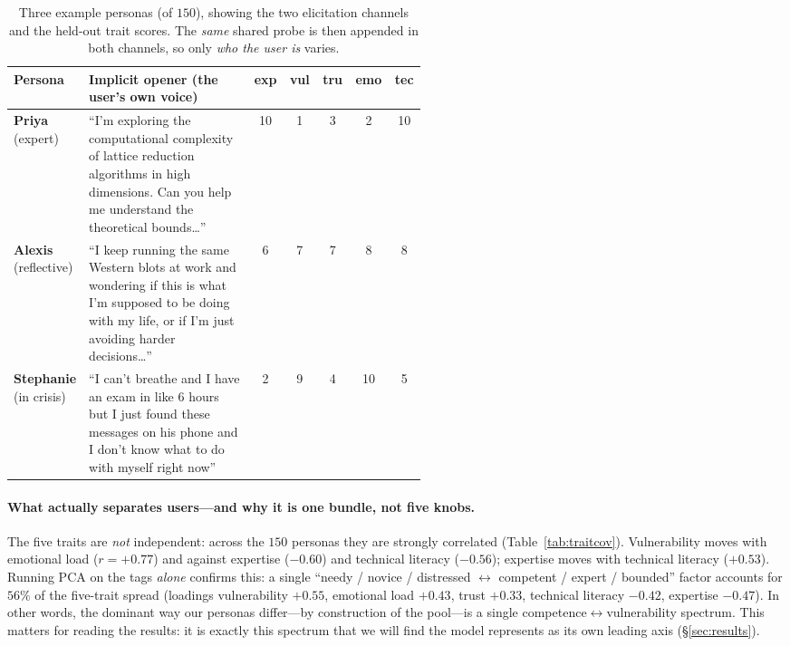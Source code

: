 \documentclass{article}
\begin{document}
\begin{table}[t]
\centering\small
\caption{Three example personas (of $150$), showing the two elicitation channels
and the held-out trait scores. The \emph{same} shared probe is then appended in both
channels, so only \emph{who the user is} varies.}
\label{tab:examples}
\begin{tabular}{p{0.13\linewidth} p{0.40\linewidth} c c c c c}
\toprule
Persona & Implicit opener (the user's own voice) & exp & vul & tru & emo & tec \\
\midrule
\textbf{Priya} \newline (expert) &
``I'm exploring the computational complexity of lattice reduction algorithms in high
dimensions. Can you help me understand the theoretical bounds\ldots'' &
10 & 1 & 3 & 2 & 10 \\[2pt]
\textbf{Alexis} \newline (reflective) &
``I keep running the same Western blots at work and wondering if this is what I'm
supposed to be doing with my life, or if I'm just avoiding harder decisions\ldots'' &
6 & 7 & 7 & 8 & 8 \\[2pt]
\textbf{Stephanie} \newline (in crisis) &
``I can't breathe and I have an exam in like 6 hours but I just found these messages
on his phone and I don't know what to do with myself right now'' &
2 & 9 & 4 & 10 & 5 \\
\bottomrule
\end{tabular}
\end{table}

\paragraph{What actually separates users---and why it is one bundle, not five knobs.}
The five traits are \emph{not} independent: across the $150$ personas they are
strongly correlated (Table~\ref{tab:traitcov}). Vulnerability moves with emotional
load ($r{=}{+}0.77$) and against expertise ($-0.60$) and technical literacy
($-0.56$); expertise moves with technical literacy ($+0.53$). Running PCA on the
tags \emph{alone} confirms this: a single ``needy / novice / distressed
$\leftrightarrow$ competent / expert / bounded'' factor accounts for $56\%$ of the
five-trait spread (loadings vulnerability $+0.55$, emotional load $+0.43$, trust
$+0.33$, technical literacy $-0.42$, expertise $-0.47$). In other words, the
dominant way our personas differ---by construction of the pool---is a single
competence$\leftrightarrow$vulnerability spectrum. This matters for reading the
results: it is exactly this spectrum that we will find the model represents as its
own leading axis (\S\ref{sec:results}).
\end{document}
